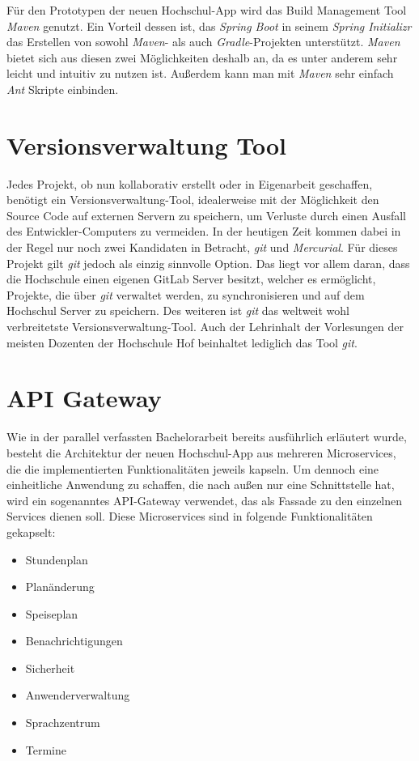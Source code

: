 Für den Prototypen der neuen Hochschul-\ac{App} wird das Build Management Tool \textit{Maven} genutzt. Ein Vorteil dessen ist, das \textit{Spring Boot} in seinem \textit{Spring Initializr} das Erstellen von sowohl \textit{Maven}- als auch \textit{Gradle}-Projekten unterstützt. \textit{Maven} bietet sich aus diesen zwei Möglichkeiten deshalb an, da es unter anderem sehr leicht und intuitiv zu nutzen ist. Außerdem kann man mit \textit{Maven} sehr einfach \textit{Ant} Skripte einbinden.

\section{Versionsverwaltung Tool}
\label{sec:git}

Jedes Projekt, ob nun kollaborativ erstellt oder in Eigenarbeit geschaffen, benötigt ein Versionsverwaltung-Tool, idealerweise mit der Möglichkeit den Source Code auf externen Servern zu speichern, um Verluste durch einen Ausfall des Entwickler-Computers zu vermeiden. In der heutigen Zeit kommen dabei in der Regel nur noch zwei Kandidaten in Betracht, \textit{git} und \textit{Mercurial}. Für dieses Projekt gilt \textit{git} jedoch als einzig sinnvolle Option. Das liegt vor allem daran, dass die Hochschule einen eigenen GitLab Server besitzt, welcher es ermöglicht, Projekte, die über \textit{git} verwaltet werden, zu synchronisieren und auf dem Hochschul Server zu speichern. Des weiteren ist \textit{git} das weltweit wohl verbreitetste Versionsverwaltung-Tool. Auch der Lehrinhalt der Vorlesungen der meisten Dozenten der Hochschule Hof beinhaltet lediglich das Tool \textit{git}.

\section{API Gateway}

Wie in der parallel verfassten Bachelorarbeit bereits ausführlich erläutert wurde, besteht die Architektur der neuen Hochschul-\ac{App} aus mehreren Microservices, die die implementierten Funktionalitäten jeweils kapseln\autocite[][]{dnba}. Um dennoch eine einheitliche Anwendung zu schaffen, die nach außen nur eine Schnittstelle hat, wird ein sogenanntes \ac{API}-Gateway verwendet, das als Fassade zu den einzelnen Services dienen soll. Diese Microservices sind in folgende Funktionalitäten gekapselt:

\begin{itemize}
\item Stundenplan
\item Planänderung
\item Speiseplan
\item Benachrichtigungen
\item Sicherheit
\item Anwenderverwaltung
\item Sprachzentrum
\item Termine
\end{itemize}

